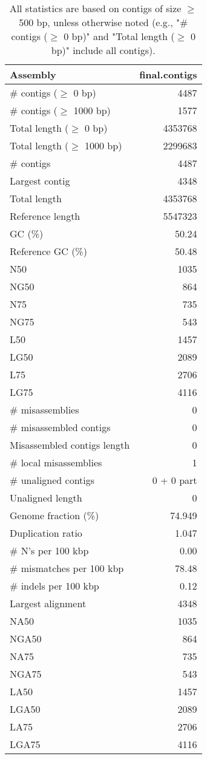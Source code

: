 \documentclass[12pt,a4paper]{article}
\begin{document}
\begin{table}[ht]
\begin{center}
\caption{All statistics are based on contigs of size $\geq$ 500 bp, unless otherwise noted (e.g., "\# contigs ($\geq$ 0 bp)" and "Total length ($\geq$ 0 bp)" include all contigs).}
\begin{tabular}{|l*{1}{|r}|}
\hline
Assembly & final.contigs \\ \hline
\# contigs ($\geq$ 0 bp) & 4487 \\ \hline
\# contigs ($\geq$ 1000 bp) & 1577 \\ \hline
Total length ($\geq$ 0 bp) & 4353768 \\ \hline
Total length ($\geq$ 1000 bp) & 2299683 \\ \hline
\# contigs & 4487 \\ \hline
Largest contig & 4348 \\ \hline
Total length & 4353768 \\ \hline
Reference length & 5547323 \\ \hline
GC (\%) & 50.24 \\ \hline
Reference GC (\%) & 50.48 \\ \hline
N50 & 1035 \\ \hline
NG50 & 864 \\ \hline
N75 & 735 \\ \hline
NG75 & 543 \\ \hline
L50 & 1457 \\ \hline
LG50 & 2089 \\ \hline
L75 & 2706 \\ \hline
LG75 & 4116 \\ \hline
\# misassemblies & 0 \\ \hline
\# misassembled contigs & 0 \\ \hline
Misassembled contigs length & 0 \\ \hline
\# local misassemblies & 1 \\ \hline
\# unaligned contigs & 0 + 0 part \\ \hline
Unaligned length & 0 \\ \hline
Genome fraction (\%) & 74.949 \\ \hline
Duplication ratio & 1.047 \\ \hline
\# N's per 100 kbp & 0.00 \\ \hline
\# mismatches per 100 kbp & 78.48 \\ \hline
\# indels per 100 kbp & 0.12 \\ \hline
Largest alignment & 4348 \\ \hline
NA50 & 1035 \\ \hline
NGA50 & 864 \\ \hline
NA75 & 735 \\ \hline
NGA75 & 543 \\ \hline
LA50 & 1457 \\ \hline
LGA50 & 2089 \\ \hline
LA75 & 2706 \\ \hline
LGA75 & 4116 \\ \hline
\end{tabular}
\end{center}
\end{table}
\end{document}
